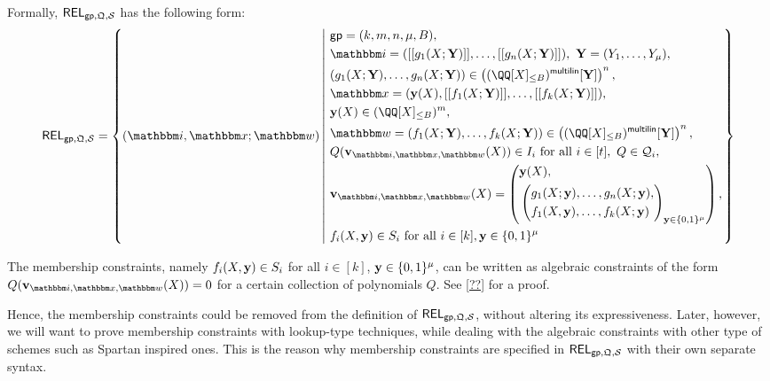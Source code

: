 \documentclass[11pt,letterpaper,usenames,dvipsnames]{article}
\begin{document}
%
    Formally, $\mathsf{REL}_{\mathsf{gp},\mathfrak{Q}, \mathcal{S}}$ has the following form:
    \begin{equation*}
    \begin{aligned}
    \REL_{\gparams,\megaQ,\cS} = \left\{ (\idx, \inp ; \wit) \left| \ \begin{aligned}
    & \gparams=(k,m,n,\mu, B),  \\
    & \idx = ( \oracle{g_1(X;\YY)},\ldots, \oracle{g_n(X;\YY)}), \ \YY=(Y_1,\ldots, Y_\mu), \\
            &(g_1(X;\YY),\dots,g_n(X;\YY))\in \left(\mainQpolyringmultilin[\YY]\right)^{n},\\
    & \inp =(\yy(X), \oracle{f_1(X;\YY)}, \ldots, \oracle{f_k(X;\YY)}),\\ &\yy(X)\in \mainQpolyring^{m},\\    
        &\wit = (f_1(X;\YY), \ldots, f_k(X;\YY)) \in \left(\mainQpolyringmultilin[\YY]\right)^{n},\\
        &Q(\vv_{\idx, \inp,\wit}(X)) \in I_i  \text{ for all } i\in [t], \ Q\in \cQ_i,\\
        &\vv_{\idx, \inp,\wit}(X) = \left(\begin{aligned}&\yy(X),\\ &\left(\begin{aligned}&g_1(X;\yy),\ldots, g_n(X;\yy),\\ &f_1(X,\yy),\ldots, f_k(X;\yy)\end{aligned}\right)_{\yy\in \BB^\mu}\\
     \end{aligned}\right),\\
        & f_i(X,\yy)\in S_i \text{ for all } i\in [k], \yy\in \{0,1\}^\mu
    \end{aligned} \right.\right\}
    \end{aligned}
    \end{equation*}

    \begin{remark}
    The membership constraints, namely $f_i(X,\mathbf{y}) \in S_i$ for all $i\in [k]$, $\mathbf{y}\in \{0,1\}^\mu$, can be written as algebraic constraints of the form $Q(\vv_{\idx,\inp,\wit}(X))=0$ for a certain collection of polynomials $Q$. See \cref{??} for a proof. 
    
    Hence, the membership constraints could be removed from the definition of $\mathsf{REL}_{\mathsf{gp}, \mathfrak{Q}, \mathcal{S}}$,  without altering its expressiveness. Later, however, we will want to prove membership constraints with lookup-type techniques, while dealing with the algebraic constraints with other type of schemes such as Spartan \cite{spartan} inspired ones. This is the reason why membership constraints are specified in $\mathsf{REL}_{\mathsf{gp},\mathfrak{Q}, \mathcal{S}}$ with their own separate syntax.
    \end{remark}
\end{document}
